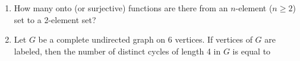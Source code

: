 \documentclass[journal]{IEEEtran}
\numberwithin{equation}{enumi}
\numberwithin{figure}{enumi}
\begin{document}
\begin{enumerate}
\begin{enumerate}
\end{enumerate}

\item How many onto (or surjective) functions are there from an $n$-element ($n \geq 2$) set to a 2-element set?

\begin{enumerate}
\end{enumerate}

\item Let $G$ be a complete undirected graph on 6 vertices. If vertices of $G$ are labeled, then the number of distinct cycles of length 4 in $G$ is equal to

\begin{enumerate}
\end{enumerate}


\end{enumerate}
\end{document}
